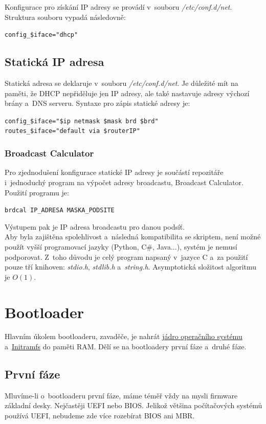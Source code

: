 \documentclass[12pt,a4paper,twoside,]{article}
\begin{document}
{{{{{{\hspace*{-1.5em}Konfigurace pro získání IP adresy se provádí v~souboru \textit{/etc/conf.d/net}. \\Struktura souboru vypadá následovně:

\texttt{config\_\$iface="dhcp"}

\subsection{\textsf{Statická IP adresa}}
Statická adresa se deklaruje v~souboru \textit{/etc/conf.d/net}. Je důležité mít na paměti, že DHCP nepřiděluje jen IP adresy, ale také nastavuje adresy výchozí brány a~DNS serveru. Syntaxe pro zápis statické adresy je:

\texttt{config\_\$iface="\$ip netmask \$mask brd \$brd"}\\
\hspace*{1.5em}\texttt{routes\_\$iface="default via \$routerIP"}
\subsubsection{\textsf{Broadcast Calculator}}
Pro zjednodušení konfigurace statické IP adresy je součástí repozitáře i~jednoduchý program na výpočet adresy broadcastu, Broadcast Calculator. Použití programu je:

\texttt{brdcal IP\_ADRESA MASKA\_PODSITE}


\hspace*{-1.5em}Výstupem pak je IP adresa broadcastu pro danou podsíť. \\


Aby byla zajištěna spolehlivost a~následná kompatibilita se skriptem, není možné použít vyšší programovací jazyky (Python, C\#, Java...), systém je nemusí podporovat. Z~toho důvodu je celý program napsaný v~jazyce C a~za použití pouze tří knihoven: \textit{stdio.h}, \textit{stdlib.h} a~\textit{string.h}. Asymptotická složitost algoritmu je $O(1)$.

\newpage
\section{\textsf{Bootloader}}

Hlavním úkolem bootloaderu, zavaděče, je nahrát \hyperlink{Kernel}{jádro operačního systému} a~\hyperlink{Initramfs}{Initramfs} do paměti RAM. Dělí se na bootloadery první fáze a~druhé fáze.
\subsection{\textsf{První fáze}}
Mluvíme-li o~bootloaderu první fáze, máme téměř vždy na mysli firmware základní desky. Nejčastěji UEFI nebo BIOS. Jelikož většina počítačových systémů používá UEFI, nebudeme zde více rozebírat BIOS ani MBR.

}}}}}}
\end{document}
